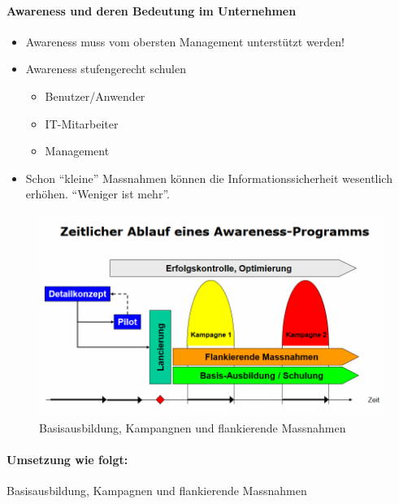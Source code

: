 \documentclass[10pt,a4paper]{article}
\begin{document}
\paragraph*{Awareness und deren Bedeutung im Unternehmen}
\begin{itemize}[noitemsep,topsep=0pt,leftmargin=*]
    \item Awareness muss vom obersten Management unterstützt werden!
    \item Awareness stufengerecht schulen
    \begin{itemize}[noitemsep,topsep=0pt,leftmargin=*]
        \item Benutzer/Anwender
        \item IT-Mitarbeiter
        \item Management
    \end{itemize}
    \item Schon "`kleine"' Massnahmen können die Informationssicherheit wesentlich erhöhen. "`Weniger ist mehr"'.
\end{itemize}

\begin{figure}[H]
    \begin{center}
    \includegraphics[width=15cm]{images/Umsetzung_Awareness-Programm.png}
    \caption{Basisausbildung, Kampangnen und flankierende Massnahmen}
    \label{Awareness-Umsetzungsprogramm}
    \end{center}
\end{figure}

\paragraph*{Umsetzung wie folgt:} Basisausbildung, Kampagnen und flankierende Massnahmen
\end{document}

